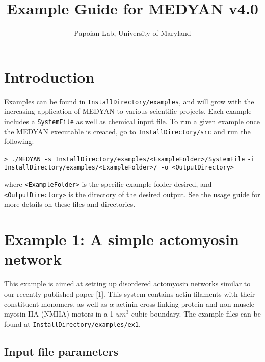 \documentclass[11pt, oneside]{article}   	%
\title{Example Guide for MEDYAN \textbf{v4.0}}
\author{Papoian Lab, University of Maryland}
\date{}							%
\begin{document}
\maketitle

\tableofcontents
\newpage

\section{Introduction}

Examples can be found in \texttt{InstallDirectory/examples}, and will grow with the increasing application of MEDYAN to various scientific projects. Each example includes a \texttt{SystemFile} as well as chemical input file. To run a given example once the MEDYAN executable is created, go to \texttt{InstallDirectory/src} and run the following:\newline

\indent \texttt{> ./MEDYAN -s InstallDirectory/examples/<ExampleFolder>/SystemFile}\newline
\indent\indent \texttt{-i InstallDirectory/examples/<ExampleFolder>/  -o <OutputDirectory>}\newline

\noindent where \texttt{<ExampleFolder>} is the specific example folder desired, and \texttt{<OutputDirectory>} is the directory of the desired output. See the usage guide for more details on these files and directories.

\section{Example 1: A simple actomyosin network}

This example is aimed at setting up disordered actomyosin networks similar to our recently published paper [1]. This system contains actin filaments with their constituent monomers, as well as $\alpha$-actinin cross-linking protein and non-muscle myosin IIA (NMIIA) motors in a 1 $um^3$ cubic boundary. The example files can be found at \texttt{InstallDirectory/examples/ex1}.

\subsection{Input file parameters}
\end{document}
